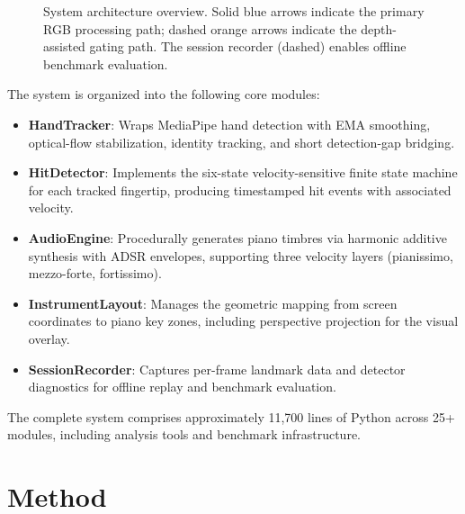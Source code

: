\documentclass[11pt,a4paper]{article}
\begin{document}
\begin{figure}[H]
{
    }
    \caption{System architecture overview. Solid blue arrows indicate the primary RGB processing path; dashed orange arrows indicate the depth-assisted gating path. The session recorder (dashed) enables offline benchmark evaluation.}
    \label{fig:architecture}
\end{figure}

The system is organized into the following core modules:

\begin{itemize}[nosep]
    \item \textbf{HandTracker}: Wraps MediaPipe hand detection with EMA smoothing, optical-flow stabilization, identity tracking, and short detection-gap bridging.
    \item \textbf{HitDetector}: Implements the six-state velocity-sensitive finite state machine for each tracked fingertip, producing timestamped hit events with associated velocity.
    \item \textbf{AudioEngine}: Procedurally generates piano timbres via harmonic additive synthesis with ADSR envelopes, supporting three velocity layers (pianissimo, mezzo-forte, fortissimo).
    \item \textbf{InstrumentLayout}: Manages the geometric mapping from screen coordinates to piano key zones, including perspective projection for the visual overlay.
    \item \textbf{SessionRecorder}: Captures per-frame landmark data and detector diagnostics for offline replay and benchmark evaluation.
\end{itemize}

The complete system comprises approximately 11,700 lines of Python across 25+ modules, including analysis tools and benchmark infrastructure.

\section{Method}
\end{document}

